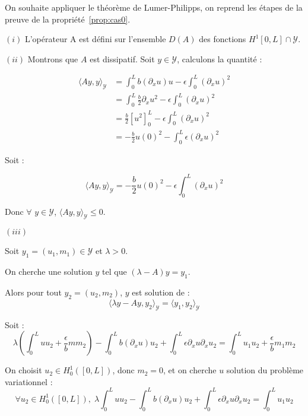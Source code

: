 \documentclass[a4paper]{article}
\newcommand{\dep}{b}
\begin{document}
\begin{preuve}

On souhaite appliquer le théorème de Lumer-Philipps, 
on reprend les étapes de la preuve de la propriété~\ref{prop:cas0}.

$(i)$
L'opérateur A est défini sur l'ensemble $D(A)$ des fonctions $H^1[0,L] \cap \mathscr{Y}$. 


$(ii)$
Montrons que $A$ est dissipatif.
Soit $y \in \mathscr{Y}$, 
calculons la quantité :

\[ \begin{split}
\langle Ay,y \rangle_{\mathscr{Y}} &= \int_0^L b (\partial_x u)u
                           - \epsilon \int_0^L (\partial_x u)^2\\
						           &= \int_0^L \displaystyle \frac{b}{2} \partial_x u^2
                           - \epsilon \int_0^L (\partial_x u)^2 \\
						           & = \displaystyle \frac{b}{2} [u^2]_0^L
                           - \epsilon \int_0^L (\partial_x u)^2 \\
	   						           & = - \displaystyle \frac{b}{2} u(0)^2
	                              - \int_0^L \epsilon (\partial_x u)^2
\end{split} \]

Soit :

\[
	\langle Ay,y \rangle_{\mathscr{Y}} = - \displaystyle \frac{b}{2} u(0)^2
	                              - \epsilon \int_0^L (\partial_x u)^2 
\]

Donc $\forall$ $y \in \mathscr{Y}$, $\langle Ay,y \rangle_{\mathscr{Y}} \leq 0$.


\vspace{0.3cm}
$(iii)$

Soit $y_1=(u_1,m_1) \in \mathscr{Y}$ et $\lambda >0$.

On cherche une solution $y$ tel que $(\lambda -A)y = y_1$.

Alors pour tout $y_2=(u_2,m_2)$, $y$ est solution de :
\begin{equation}
	\label{eq:surj2}
\langle \lambda y-Ay,y_2 \rangle_{\mathscr{Y}} = \langle y_1,y_2 \rangle_{\mathscr{Y}}
\end{equation}

Soit :
\[
\lambda (\int_0^L u u_2 + \displaystyle \frac{\epsilon}{\dep}mm_2)
- \int_0^L b (\partial_xu)u_2 
+  \int_0^L \epsilon \partial_xu \partial_xu_2
= \int_0^L u_1 u_2 + \displaystyle \frac{\epsilon}{\dep} m_1 m_2
\]

On choisit $u_2\in H_0^1([0,L])$, donc $m_2=0$, et on cherche $u$ solution du problème variationnel :
\[\forall u_2 \in H_0^1([0,L]), \;
\lambda  \int_0^L u u_2
- \int_0^L b (\partial_xu)u_2 
+ \int_0^L \epsilon \partial_xu \partial_xu_2 
= \int_0^L u_1 u_2 \]


\end{preuve}
\end{document}
